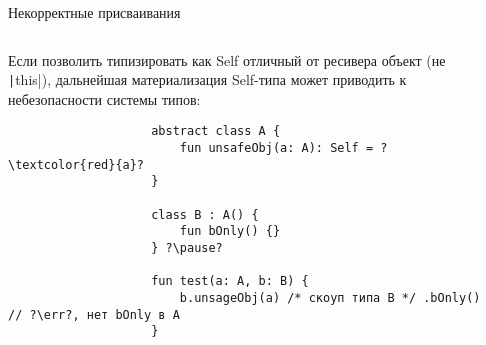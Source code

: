 \documentclass[handout,aspectratio=169,usenames,dvipsnames]{beamer}
\newcommand{\err}[0]{\textcolor{red}{ошибка}}
\begin{document}
    \begin{frame}[fragile]{Некорректные присваивания}
        \begin{columns}[onlytextwidth]
            \begin{column}{0.99\textwidth}
                Если позволить типизировать как Self отличный от ресивера объект (не \texttt|this|), дальнейшая материализация Self-типа может приводить к небезопасности системы типов:
                \pause
                \begin{verbatim}
                    abstract class A {
                        fun unsafeObj(a: A): Self = ?\textcolor{red}{a}?
                    }

                    class B : A() {
                        fun bOnly() {}
                    } ?\pause?

                    fun test(a: A, b: B) {
                        b.unsageObj(a) /* скоуп типа B */ .bOnly() // ?\err?, нет bOnly в A
                    }
                \end{verbatim}
            \end{column}\hfill%
            \begin{column}{0.0\textwidth}
            \end{column}
        \end{columns}
    \end{frame}
\end{document}
